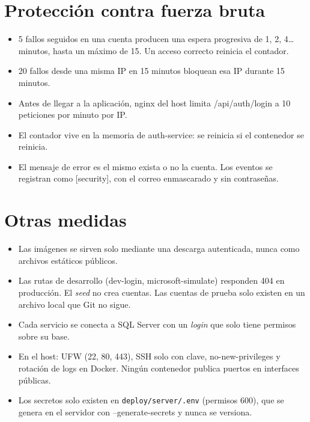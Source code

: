 \documentclass[11pt,a4paper,oneside]{report}
\newcommand{\codus}{\textunderscore\allowbreak}
\DeclareRobustCommand{\cod}[1]{{\small\ttfamily\let\_\codus #1}}
\DeclareRobustCommand{\ruta}[1]{{\small\nolinkurl{#1}}}
\begin{document}
\section{Protección contra fuerza bruta}
\begin{itemize}
  \item 5 fallos seguidos en una cuenta producen una espera progresiva de 1, 2, 4\ldots{} minutos, hasta un máximo de 15.
        Un acceso correcto reinicia el contador.
  \item 20 fallos desde una misma IP en 15 minutos bloquean esa IP durante 15 minutos.
  \item Antes de llegar a la aplicación, nginx del host limita \cod{/api/auth/login} a 10 peticiones por minuto por IP.
  \item El contador vive en la memoria de auth-service: se reinicia si el contenedor se reinicia.
  \item El mensaje de error es el mismo exista o no la cuenta. Los eventos se registran como
        \cod{[security]}, con el correo enmascarado y sin contraseñas.
\end{itemize}

\section{Otras medidas}
\begin{itemize}
  \item Las imágenes se sirven solo mediante una descarga autenticada, nunca como archivos estáticos públicos.
  \item Las rutas de desarrollo (\cod{dev-login}, \cod{microsoft-simulate}) responden 404 en producción.
        El \emph{seed} no crea cuentas. Las cuentas de prueba solo existen en un archivo local que Git no sigue.
  \item Cada servicio se conecta a SQL Server con un \emph{login} que solo tiene permisos sobre su base.
  \item En el host: UFW (22, 80, 443), SSH solo con clave, \cod{no-new-privileges} y rotación de logs en Docker.
        Ningún contenedor publica puertos en interfaces públicas.
  \item Los secretos solo existen en \ruta{deploy/server/.env} (permisos 600), que se genera en el servidor
        con \cod{--generate-secrets} y nunca se versiona.
\end{itemize}

\end{document}
